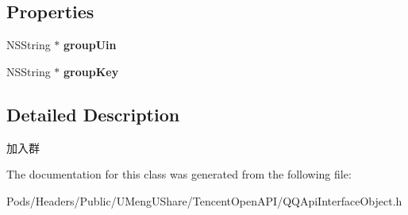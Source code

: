 \subsection*{Properties}
\begin{DoxyCompactItemize}
\item 
\mbox{\label{interface_q_q_api_join_group_object_a06811c5a609ed877417549dd3d02d600}} 
N\+S\+String $\ast$ {\bfseries group\+Uin}
\item 
\mbox{\label{interface_q_q_api_join_group_object_a25725a796dbfacbe83297e5888ea96ba}} 
N\+S\+String $\ast$ {\bfseries group\+Key}
\end{DoxyCompactItemize}


\subsection{Detailed Description}
加入群 

The documentation for this class was generated from the following file\+:\begin{DoxyCompactItemize}
\item 
Pods/\+Headers/\+Public/\+U\+Meng\+U\+Share/\+Tencent\+Open\+A\+P\+I/Q\+Q\+Api\+Interface\+Object.\+h\end{DoxyCompactItemize}
